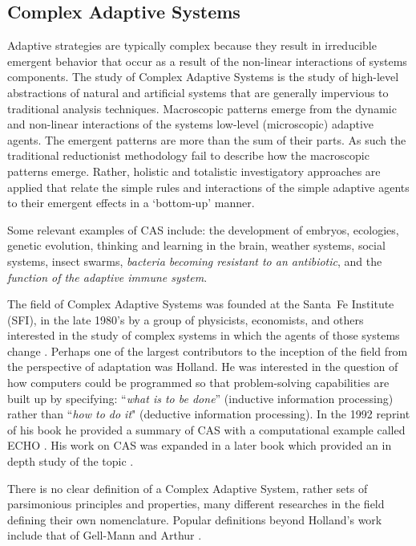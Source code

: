 \documentclass[a4paper, 11pt]{article}
\begin{document}
\subsection{Complex Adaptive Systems}
Adaptive strategies are typically complex because they result in irreducible emergent behavior that occur as a result of the non-linear interactions of systems components.
The study of Complex Adaptive Systems is the study of high-level abstractions of natural and artificial systems that are generally impervious to traditional analysis techniques. Macroscopic patterns emerge from the dynamic and non-linear interactions of the systems low-level (microscopic) adaptive agents. The emergent patterns are more than the sum of their parts. As such the traditional reductionist methodology fail to describe how the macroscopic patterns emerge. Rather, holistic and totalistic investigatory approaches are applied that relate the simple rules and interactions of the simple adaptive agents to their emergent effects in a `bottom-up' manner. 

Some relevant examples of CAS include: the development of embryos, ecologies, genetic evolution, thinking and learning in the brain, weather systems, social systems, insect swarms, \emph{bacteria becoming resistant to an antibiotic}, and the \emph{function of the adaptive immune system}. 

The field of Complex Adaptive Systems was founded at the Santa~Fe Institute (SFI), in the late 1980's by a group of physicists, economists, and others interested in the study of complex systems in which the agents of those systems change \cite{Anderson1988}. Perhaps one of the largest contributors to the inception of the field from the perspective of adaptation was Holland. He was interested in the question of how computers could be programmed so that problem-solving capabilities are built up by specifying: ``\emph{what is to be done}'' (inductive information processing) rather than ``\emph{how to do it}" (deductive information processing). In the 1992 reprint of his book he provided a summary of CAS with a computational example called ECHO \cite{Holland1975}. His work on CAS was expanded in a later book which provided an in depth study of the topic \cite{Holland1995}.
 
There is no clear definition of a Complex Adaptive System, rather sets of parsimonious principles and properties, many different researches in the field defining their own nomenclature. Popular definitions beyond Holland's work include that of Gell-Mann \cite{Gell-Mann1994} and Arthur \cite{Arthur1997}.
\end{document}
